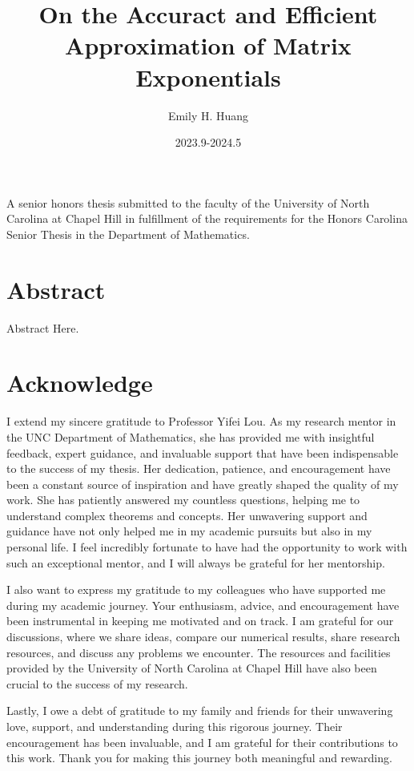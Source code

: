 \documentclass[12pt]{article}
\title{On the Accuract and Efficient Approximation of Matrix Exponentials}
\author{Emily H. Huang}
\date{2023.9-2024.5}
\begin{document}
\maketitle
A senior honors thesis submitted to the faculty of the University of North Carolina at Chapel Hill in fulfillment of the requirements for the Honors Carolina Senior Thesis in the Department of Mathematics.


\newpage
\section*{Abstract}
Abstract Here.

\newpage
\section*{Acknowledge}
I extend my sincere gratitude to Professor Yifei Lou. As my research mentor in the UNC Department of Mathematics, 
she has provided me with insightful feedback, expert guidance, and invaluable support that have been indispensable 
to the success of my thesis. Her dedication, patience, and encouragement have been a constant source of 
inspiration and have greatly shaped the quality of my work. She has patiently answered my countless questions, 
helping me to understand complex theorems and concepts. Her unwavering support and guidance have not only helped 
me in my academic pursuits but also in my personal life. I feel incredibly fortunate to have had the opportunity 
to work with such an exceptional mentor, and I will always be grateful for her mentorship.\par
I also want to express my gratitude to my colleagues who have supported me during my academic journey. 
Your enthusiasm, advice, and encouragement have been instrumental in keeping me motivated and on track. 
I am grateful for our discussions, where we share ideas, compare our numerical results, share research resources, 
and discuss any problems we encounter.  The resources and facilities provided by the University of North Carolina 
at Chapel Hill have also been crucial to the success of my research. \par
Lastly, I owe a debt of gratitude to my family and friends for their unwavering love, support, and understanding 
during this rigorous journey. Their encouragement has been invaluable, and I am grateful for their contributions 
to this work. Thank you for making this journey both meaningful and rewarding.
\end{document}
